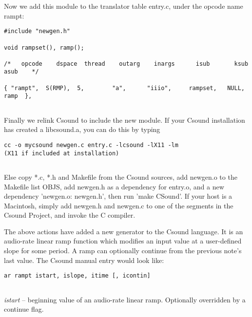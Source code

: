  


  Now we add this module to the translator table entry.c, under the opcode name rampt: 


 
\begin{lstlisting}
#include "newgen.h"
  
void rampset(), ramp();
  
/*   opcode    dspace  thread    outarg    inargs      isub       ksub     asub    */
  
{ "rampt",  S(RMP),  5,        "a",      "iiio",     rampset,   NULL,    ramp  },
      
\end{lstlisting}


 


  Finally we relink Csound to include the new module. If your Csound installation has created a libcsound.a, you can do this by typing 


 
\begin{lstlisting}
cc -o mycsound newgen.c entry.c -lcsound -lX11 -lm
(X11 if included at installation)
      
\end{lstlisting}


 


  Else copy *.c, *.h and Makefile from the Csound sources, add newgen.o to the Makefile list OBJS, add newgen.h as a dependency for entry.o, and a new dependency 'newgen.o: newgen.h', then run 'make CSound'. If your host is a Macintosh, simply add newgen.h and newgen.c to one of the segments in the Csound Project, and invoke the C compiler. 


  The above actions have added a new generator to the Csound language. It is an audio-rate linear ramp function which modifies an input value at a user-defined slope for some period. A ramp can optionally continue from the previous note's last value. The Csound manual entry would look like: 


 
\begin{lstlisting}
ar rampt istart, islope, itime [, icontin]
      
\end{lstlisting}


 


 \emph{istart}
 -- beginning value of an audio-rate linear ramp. Optionally overridden by a continue flag. 


